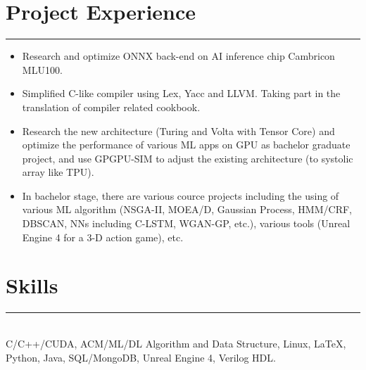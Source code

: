 \documentclass[a4paper]{article}
\begin{document}
		\section*{Project Experience}
		\rule[1pt]{18cm}{0.01em}
		\begin{itemize}
		\item Research and optimize ONNX back-end on AI inference chip Cambricon MLU100. 
		\item Simplified C-like compiler using Lex, Yacc and LLVM. Taking part in the translation of compiler related cookbook.
		\item Research the new architecture (Turing and Volta with Tensor Core) and optimize the performance of various ML apps on GPU as bachelor graduate project, and use GPGPU-SIM to adjust the existing architecture (to systolic array like TPU). 
		\item In bachelor stage, there are various cource projects including the using of various ML algorithm (NSGA-II, MOEA/D, Gaussian Process, HMM/CRF, DBSCAN, NNs including C-LSTM, WGAN-GP, etc.), various tools (Unreal Engine 4 for a 3-D action game), etc.
		\end{itemize}
		\section*{Skills}
		\rule[1pt]{18cm}{0.01em}\\
		C/C++/CUDA, ACM/ML/DL Algorithm and Data Structure, Linux, \LaTeX, Python, Java, SQL/MongoDB, Unreal Engine 4, Verilog HDL.
		
	
\end{document}
